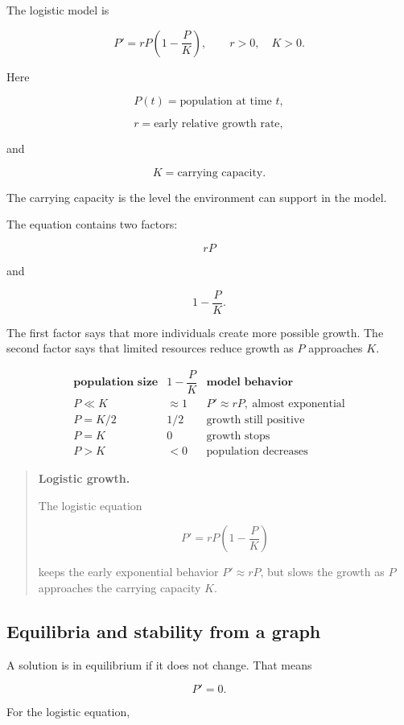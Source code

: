 The logistic model is

\[
\boxed{
P'=rP\left(1-\frac{P}{K}\right),
\qquad r>0,\quad K>0.
}
\]

Here

\[
P(t)=\text{population at time }t,
\]

\[
r=\text{early relative growth rate},
\]

and

\[
K=\text{carrying capacity}.
\]

The carrying capacity is the level the environment can support in the model.

The equation contains two factors:

\[
rP
\]

and

\[
1-\frac{P}{K}.
\]

The first factor says that more individuals create more possible growth.  The second
factor says that limited resources reduce growth as \(P\) approaches \(K\).

\[
\begin{array}{c|c|c}
\textbf{population size} & 1-\dfrac{P}{K} & \textbf{model behavior} \\ \hline
P\ll K & \approx1 & P'\approx rP,\ \text{almost exponential} \\[6pt]
P=K/2 & 1/2 & \text{growth still positive} \\[6pt]
P=K & 0 & \text{growth stops} \\[6pt]
P>K & <0 & \text{population decreases}
\end{array}
\]

\begin{quote}
\textbf{Logistic growth.}

The logistic equation

\[
P'=rP\left(1-\frac{P}{K}\right)
\]

keeps the early exponential behavior \(P'\approx rP\), but slows the growth as
\(P\) approaches the carrying capacity \(K\).
\end{quote}

\subsection{Equilibria and stability from a graph}
\label{subsec:equilibria-stability-graph}

A solution is in equilibrium if it does not change.  That means

\[
P'=0.
\]

For the logistic equation,


